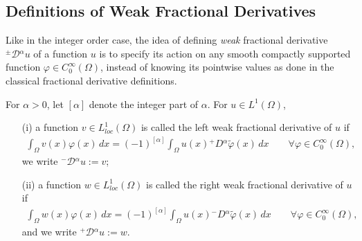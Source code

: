 \documentclass[leqno,final]{siamltex}
\numberwithin{equation}{section}
\renewcommand{\(}{\bigl(}
\renewcommand{\)}{\bigr)}
\newcommand{\R}{\mathbb{R}}
\begin{document}
\subsection{Definitions of Weak Fractional Derivatives}\label{sec-4.1}
%
Like in the integer order case, the idea of defining {\em weak} fractional derivative ${^{\pm}}{ \mathcal{D}}{^{\alpha}} u$ of a function $u$ is to specify its action on any smooth compactly supported function $\varphi \in C^{\infty}_{0}(\Omega)$, 
instead of knowing its pointwise values as done in the classical fractional derivative definitions.

    \begin{definition}\label{RWFD}
        For $\alpha> 0$, let $[\alpha]$ denote the integer part of $\alpha$. For $u \in L^{1}(\Omega)$, 
       \begin{itemize} 
       \item[{\rm (i)}] a function $v \in L_{loc}^{1} (\Omega)$ is called the left weak fractional derivative of $u$ if 
        \begin{align*}
            \int_{\Omega} v(x) \varphi(x) \,dx = (-1)^{[\alpha]} \int_{\Omega} u(x) {^{+}}{D}{^{\alpha}} \tilde{\varphi}(x) \, dx
             \qquad \forall \varphi \in C_{0}^{\infty} (\Omega),
        \end{align*}
        we write ${^{-}}{ \mathcal{D}}{^{\alpha}} u:=v$; 
     \item[{\rm (ii)}] a function $w\in L_{loc}^{1} (\Omega)$ is called the right weak fractional derivative of $u$ if 
      \begin{align*}
       \int_{\Omega} w(x) \varphi(x) \,dx = (-1)^{[\alpha]} \int_{\Omega} u(x) {^{-}}{D}{}^{\alpha} \tilde{\varphi}(x) \,dx
       \qquad \forall \varphi \in C_{0}^{\infty} (\Omega), 
      \end{align*}
       and we write ${^{+}}{\mathcal{D}}{^{\alpha}} u:=w$. 
      \end{itemize}
   \end{definition}
\end{document}
